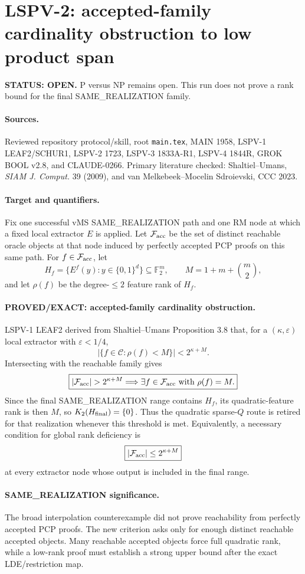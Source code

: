 \documentclass[11pt]{article}
\begin{document}
\section*{LSPV-2: accepted-family cardinality obstruction to low product span}
\textbf{STATUS: OPEN.} P versus NP remains open. This run does not prove a rank bound for the final SAME\_REALIZATION family.
\paragraph{Sources.} Reviewed repository protocol/skill, root \texttt{main.tex}, MAIN 1958, LSPV-1 LEAF2/SCHUR1, LSPV-2 1723, LSPV-3 1833A-R1, LSPV-4 1844R, GROK BOOL v2.8, and CLAUDE-0266. Primary literature checked: Shaltiel--Umans, \emph{SIAM J. Comput.} 39 (2009), and van Melkebeek--Mocelin Sdroievski, CCC 2023.
\paragraph{Target and quantifiers.} Fix one successful vMS SAME\_REALIZATION path and one RM node at which a fixed local extractor \(E\) is applied. Let \(\mathcal F_{\rm acc}\) be the set of distinct reachable oracle objects at that node induced by perfectly accepted PCP proofs on this same path. For \(f\in\mathcal F_{\rm acc}\), let
\[
H_f=\{E^f(y):y\in\{0,1\}^d\}\subseteq\mathbb F_2^m,\qquad M=1+m+\binom m2,
\]
and let \(\rho(f)\) be the degree-\(\le2\) feature rank of \(H_f\).
\paragraph{PROVED/EXACT: accepted-family cardinality obstruction.} LSPV-1 LEAF2 derived from Shaltiel--Umans Proposition 3.8 that, for a \((\kappa,\varepsilon)\) local extractor with \(\varepsilon<1/4\),
\[
\left|\{f\in\mathcal C:\rho(f)<M\}\right|<2^{\kappa+M}.
\]
Intersecting with the reachable family gives
\[
\boxed{|\mathcal F_{\rm acc}|>2^{\kappa+M}\Longrightarrow \exists f\in\mathcal F_{\rm acc}\text{ with }\rho(f)=M.}
\]
Since the final SAME\_REALIZATION range contains \(H_f\), its quadratic-feature rank is then \(M\), so \(K_2(H_{\rm final})=\{0\}\). Thus the quadratic sparse-\(Q\) route is retired for that realization whenever this threshold is met. Equivalently, a necessary condition for global rank deficiency is
\[
\boxed{|\mathcal F_{\rm acc}|\le 2^{\kappa+M}}
\]
at every extractor node whose output is included in the final range.
\paragraph{SAME\_REALIZATION significance.} The broad interpolation counterexample did not prove reachability from perfectly accepted PCP proofs. The new criterion asks only for enough distinct reachable accepted objects. Many reachable accepted objects force full quadratic rank, while a low-rank proof must establish a strong upper bound after the exact LDE/restriction map.
\end{document}
